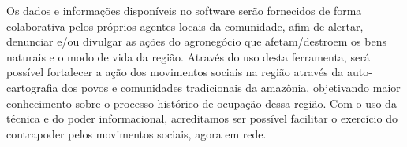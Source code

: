 Os dados e informações disponíveis no software serão fornecidos de forma colaborativa pelos próprios agentes locais da comunidade, afim de alertar, denunciar e/ou divulgar as ações do agronegócio que afetam/destroem os bens naturais e o modo de vida da região. Através do uso desta ferramenta, será possível fortalecer a ação dos movimentos sociais na região através da auto-cartografia dos povos e comunidades tradicionais da amazônia, objetivando maior conhecimento sobre o processo histórico de ocupação dessa região. Com o uso da técnica e do poder informacional, acreditamos ser possível facilitar o exercício do contrapoder pelos movimentos sociais, agora em rede.


